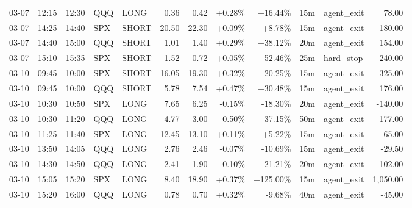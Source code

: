 \documentclass[11pt,a4paper]{article}
\begin{document}
\begin{center}
\begin{longtable}{>{\color{txtmain}}l l l l l r r r r r >{\color{txtmain}}l r}
03-07 & 12:15 & 12:30 & QQQ & LONG & 0.36 & 0.42 & \textcolor{wingreen}{+0.28\%} & \textcolor{wingreen}{+16.44\%} & 15m & agent\_exit & \textcolor{wingreen}{78.00} \\
03-07 & 14:25 & 14:40 & SPX & SHORT & 20.50 & 22.30 & \textcolor{wingreen}{+0.09\%} & \textcolor{wingreen}{+8.78\%} & 15m & agent\_exit & \textcolor{wingreen}{180.00} \\
03-07 & 14:40 & 15:00 & QQQ & SHORT & 1.01 & 1.40 & \textcolor{wingreen}{+0.29\%} & \textcolor{wingreen}{+38.12\%} & 20m & agent\_exit & \textcolor{wingreen}{154.00} \\
03-07 & 15:10 & 15:35 & SPX & SHORT & 1.52 & 0.72 & \textcolor{wingreen}{+0.05\%} & \textcolor{lossred}{-52.46\%} & 25m & hard\_stop & \textcolor{lossred}{-240.00} \\
03-10 & 09:45 & 10:00 & SPX & SHORT & 16.05 & 19.30 & \textcolor{wingreen}{+0.32\%} & \textcolor{wingreen}{+20.25\%} & 15m & agent\_exit & \textcolor{wingreen}{325.00} \\
03-10 & 09:45 & 10:00 & QQQ & SHORT & 5.78 & 7.54 & \textcolor{wingreen}{+0.47\%} & \textcolor{wingreen}{+30.48\%} & 15m & agent\_exit & \textcolor{wingreen}{176.00} \\
03-10 & 10:30 & 10:50 & SPX & LONG & 7.65 & 6.25 & \textcolor{lossred}{-0.15\%} & \textcolor{lossred}{-18.30\%} & 20m & agent\_exit & \textcolor{lossred}{-140.00} \\
03-10 & 10:30 & 11:20 & QQQ & LONG & 4.77 & 3.00 & \textcolor{lossred}{-0.50\%} & \textcolor{lossred}{-37.15\%} & 50m & agent\_exit & \textcolor{lossred}{-177.00} \\
03-10 & 11:25 & 11:40 & SPX & LONG & 12.45 & 13.10 & \textcolor{wingreen}{+0.11\%} & \textcolor{wingreen}{+5.22\%} & 15m & agent\_exit & \textcolor{wingreen}{65.00} \\
03-10 & 13:50 & 14:05 & QQQ & LONG & 2.76 & 2.46 & \textcolor{lossred}{-0.07\%} & \textcolor{lossred}{-10.69\%} & 15m & agent\_exit & \textcolor{lossred}{-29.50} \\
03-10 & 14:30 & 14:50 & QQQ & LONG & 2.41 & 1.90 & \textcolor{lossred}{-0.10\%} & \textcolor{lossred}{-21.21\%} & 20m & agent\_exit & \textcolor{lossred}{-102.00} \\
03-10 & 15:05 & 15:20 & SPX & LONG & 8.40 & 18.90 & \textcolor{wingreen}{+0.37\%} & \textcolor{wingreen}{+125.00\%} & 15m & agent\_exit & \textcolor{wingreen}{1,050.00} \\
03-10 & 15:20 & 16:00 & QQQ & LONG & 0.78 & 0.70 & \textcolor{wingreen}{+0.32\%} & \textcolor{lossred}{-9.68\%} & 40m & agent\_exit & \textcolor{lossred}{-45.00} \\

\end{longtable}
\end{center}
\end{document}
